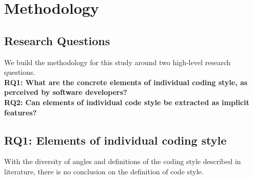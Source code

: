 \section{Methodology}
\subsection{Research Questions}
We build the methodology for this study around two high-level research questions.\\

\textbf{RQ1: What are the concrete elements of individual coding style, as perceived by software developers?}\\

\textbf{RQ2: Can elements of individual code style be extracted as implicit features?}\\

\subsection{RQ1: Elements of individual coding style}

With the diversity of angles and definitions of the coding style described in literature, there is no conclusion on the definition of code style.   


